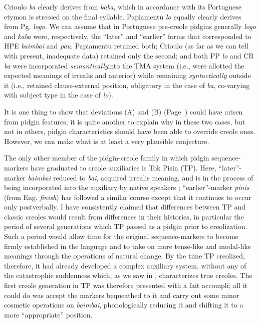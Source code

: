 Crioulo \textit{ba} clearly derives from \textit{kaba}, which in accordance with its Portuguese etymon is stressed on the final syllable. Papiamentu \textit{lo} equally clearly derives from Pg. \textit{logo}. We can assume that in Portuguese pre-creole pidgins generally \textit{logo} and \textit{kaba} were, respectively, the ``later'' and ``earlier'' forms that corresponded to HPE \textit{baimbai} and \textit{pau}. Papiamentu retained both; Crioulo (as far as we can tell with present, inadequate data) retained only the second; and both PP \textit{lo} and CR \textit{ba} were incorporated \textit{semantically}into the TMA system (i.e., were allotted the expected meanings of irrealis and anterior) while remaining \textit{syntactically} outside it (i.e., retained clause-external position, obligatory in the case of \textit{ba}, co-varying with subject type in the case of \textit{lo}).

It is one thing to show that deviations (A) and (B) (Page~\pageref{majordeviations}) could have arisen from pidgin features; it is quite another to explain why in these two cases, but not in others, pidgin characteristics should have been able to override creole ones. However, we can make what is at least a very plausible conjecture.

The only other member of the pidgin-creole family in which pidgin sequence-markers have graduated to creole auxiliaries is Tok Pisin (TP). Here, ``later''-marker \textit{baimbai} reduced to \textit{bai}, acquired irrealis meaning, and is in the process of being incorporated into the auxiliary by native speakers \citep{SankoffEtAl1974}; ``earlier''-marker \textit{pinis} (from Eng. \textit{finish}) has followed a similar course except that it continues to occur only postverbally. I have consistently claimed that differences between TP and classic creoles would result from differences in their histories, in particular the period of several genera\-tions which TP passed as a pidgin prior to creolization. Such a period would allow time for the original sequence-markers to become firmly established in the language and to take on more tense-like and modal-like meanings through the operations of natural change. By the time TP creolized, therefore, it had already developed a complex auxiliary system, without any of the catastrophic suddenness which, as we saw
in , characterizes true creoles. The first creole generation in TP was therefore presented with a fait accompli; all it could do was accept the markers bequeathed to it and carry out some minor cosmetic operations on \textit{baimbai}, phonologically reducing it and shifting it to a more ``appropriate'' position.

